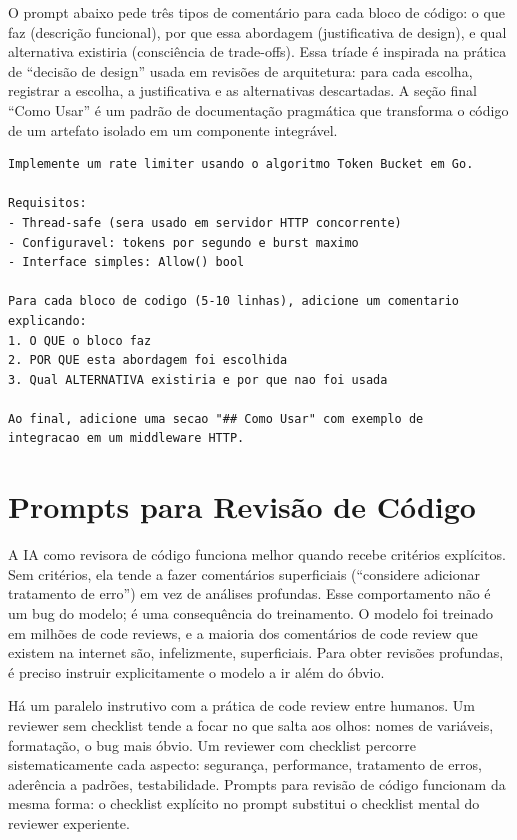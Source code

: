 O prompt abaixo pede três tipos de comentário para cada bloco de código: o que
faz (descrição funcional), por que essa abordagem (justificativa de design), e
qual alternativa existiria (consciência de trade-offs). Essa tríade é inspirada
na prática de ``decisão de design'' usada em revisões de arquitetura: para cada
escolha, registrar a escolha, a justificativa e as alternativas descartadas.
A seção final ``Como Usar'' é um padrão de documentação pragmática que
transforma o código de um artefato isolado em um componente integrável.

\begin{lstlisting}[language={}, caption={Prompt para código explicado}]
Implemente um rate limiter usando o algoritmo Token Bucket em Go.

Requisitos:
- Thread-safe (sera usado em servidor HTTP concorrente)
- Configuravel: tokens por segundo e burst maximo
- Interface simples: Allow() bool

Para cada bloco de codigo (5-10 linhas), adicione um comentario
explicando:
1. O QUE o bloco faz
2. POR QUE esta abordagem foi escolhida
3. Qual ALTERNATIVA existiria e por que nao foi usada

Ao final, adicione uma secao "## Como Usar" com exemplo de
integracao em um middleware HTTP.
\end{lstlisting}

\section{Prompts para Revisão de Código}

A IA como revisora de código funciona melhor quando recebe critérios explícitos.
Sem critérios, ela tende a fazer comentários superficiais (``considere adicionar
tratamento de erro'') em vez de análises profundas. Esse comportamento não é
um bug do modelo; é uma consequência do treinamento. O modelo foi treinado
em milhões de code reviews, e a maioria dos comentários de code review que
existem na internet são, infelizmente, superficiais. Para obter revisões
profundas, é preciso instruir explicitamente o modelo a ir além do óbvio.

Há um paralelo instrutivo com a prática de code review entre humanos. Um reviewer
sem checklist tende a focar no que salta aos olhos: nomes de variáveis,
formatação, o bug mais óbvio. Um reviewer com checklist percorre sistematicamente
cada aspecto: segurança, performance, tratamento de erros, aderência a padrões,
testabilidade. Prompts para revisão de código funcionam da mesma forma: o checklist
explícito no prompt substitui o checklist mental do reviewer experiente.

